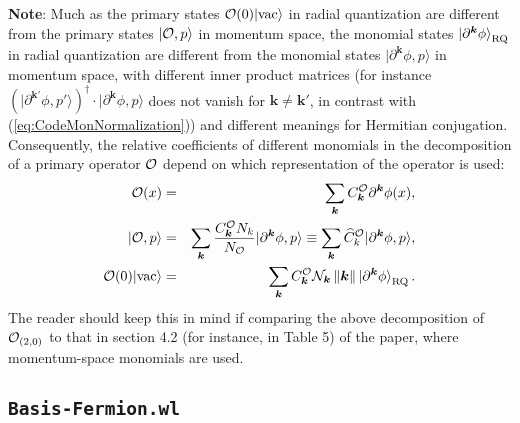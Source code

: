 \documentclass[12pt]{article}
\def\>{\rangle}
\newcommand{\be}{\begin{eqnarray}}
\newcommand{\ee}{\end{eqnarray}}
\newcommand{\CN}{{\cal N}}
\newcommand{\CO}{{\cal O}}
\newcommand{\nn}{\nonumber}
\newcommand{\p}{\partial}
\newcommand{\bk}{\boldsymbol{k}}
\newcommand{\norm}[1]{\left\lVert#1\right\rVert}
\newcommand{\wh}{\widehat}
\newcommand{\rket}[1]{\ket{#1}_{\rm RQ}}
\newcommand{\kvec}{\boldsymbol{k}}
\begin{document}
{\bf Note}: Much as the primary states $\CO(0)| {\rm vac}\>$ in radial quantization are different from the primary states $|\CO, p\>$ in momentum space, the monomial states $\rket{ \p^{\kvec} \phi }$ in radial quantization are different from the monomial states $|\p^{\kvec} \phi, p\>$ in momentum space, with different inner product matrices (for instance $\left( | \p^{\kvec '} \phi, p' \> \right)^\dagger \cdot | \p^{\kvec} \phi, p \>$ does not vanish for $\kvec \ne \kvec'$, in contrast with (\ref{eq:CodeMonNormalization})) and different meanings for Hermitian conjugation.  Consequently, the relative coefficients of different monomials in the decomposition of a primary operator $\CO$ depend on which representation of the operator is used:
\be
\CO(x) &=& \sum_{\bk} C_{\bk}^{\CO} \p^{\bk} \phi(x) , \nn\\
| \CO, p \> &=&  \sum_{\bk} \frac{C_{\bk}^{\CO} N_k}{N_{\CO}} | \p^{\bk} \phi, p\> \equiv \sum_{\bk} \wh{C}_k^{\CO} | \p^{\bk} \phi, p \> , \nn\\
\CO(0) | \textrm{vac} \> &=& \sum_{\bk} C_{\bk}^{\CO} \CN_{\bk} \norm{\bk}  \rket{\p^{\bk} \phi}.
\ee
 The reader should keep this in mind if comparing the above decomposition of $\CO_{(2,0)}$ to that in section 4.2 (for instance, in Table 5) of the paper, where momentum-space monomials are used.  

\subsection{{\tt Basis-Fermion.wl}}
\end{document}
